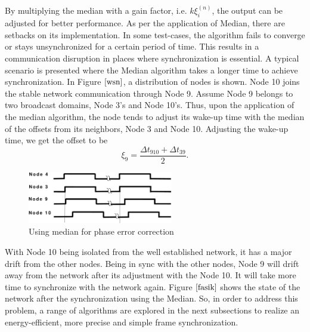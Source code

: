 \documentclass[journal]{IEEEtran}
\begin{document}
By multiplying the median with a gain factor,
i.e. $k\xi_i^{(n)}$, the output can be adjusted for better
performance. 
\newline As per the application of Median,
there are setbacks on its implementation. In some test-cases, the
algorithm fails to converge or stays unsynchronized for a certain
period of time. This results in a  communication disruption
in places where synchronization is essential.
\newline A typical scenario is presented where the Median
algorithm takes a longer time to achieve synchronization. In Figure
$\ref{wsn}$, a distribution of nodes is shown. Node 10 joins 
the stable network communication through Node 9. Assume Node
9 belongs to two broadcast domains, Node 3's and Node 10's. Thus,
upon the application of the median algorithm, the node tends to
adjust its wake-up time with the median of the offsets from its
neighbors, Node 3 and Node 10. Adjusting the wake-up time, we get
the offset to be
\begin{equation}
\xi_9 = \frac{\Delta t_{910} + \Delta t_{39}}{2}.
\end{equation}
\begin{figure}[t]
\centering
\includegraphics[width= 2.5in]{offsetpic}
\caption{Using median for phase error correction} \label{fasik}
\end{figure}
\noindent With Node 10 being isolated from the well established
network, it has a major drift from the other nodes. Being in sync
with the other nodes, Node 9 will drift away from the network after
its adjustment with the Node 10. It will take more time to
synchronize with the network again. Figure $\ref{fasik}$ shows the state of the network after the
synchronization using the Median. 
\newline So, in order to address this problem, a range of
algorithms are explored in the next subsections to realize an
energy-efficient, more precise and simple frame
synchronization.
\end{document}
